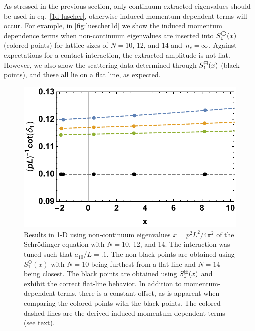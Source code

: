 As stressed in the previous section, only continuum extracted eigenvalues should be used in eq.~\eqref{1d luscher}, otherwise induced momentum-dependent terms will occur.
For example, in \autoref{fig:luescher1d} we show the induced momentum dependence terms when non-continuum eigenvalues are inserted into $S^{\bigcirc}_1(x)$ (colored points) for lattice sizes of $N=10$, 12, and 14 and ${n_s}=\infty$.
Against expectations for a contact interaction, the extracted amplitude is not flat.
However, we also show the scattering data determined through $S^{\boxplus}_1(x)$ (black points), and these all lie on a flat line, as expected.

\begin{figure}
\center
\includegraphics[width=.65\textwidth]{figure/luescher1d.pdf}
\caption{Results in 1-D using non-continuum eigenvalues $x=p^2L^2/4\pi^2$ of the Schr\"odinger equation with $N=10$, 12, and 14.  The interaction was tuned such that $a_{10}/L=.1$.  The non-black points are obtained using $S^\bigcirc_1(x)$ with $N=10$ being furthest from a flat line and $N=14$ being closest.  The black points are obtained using $S^{\boxplus}_1(x)$  and exhibit the correct flat-line behavior.  In addition to momentum-dependent terms, there is a constant offset, as is apparent when comparing the colored points with the black points.  The colored dashed lines are the derived induced momentum-dependent terms (see text).\label{fig:luescher1d}}
\end{figure}

